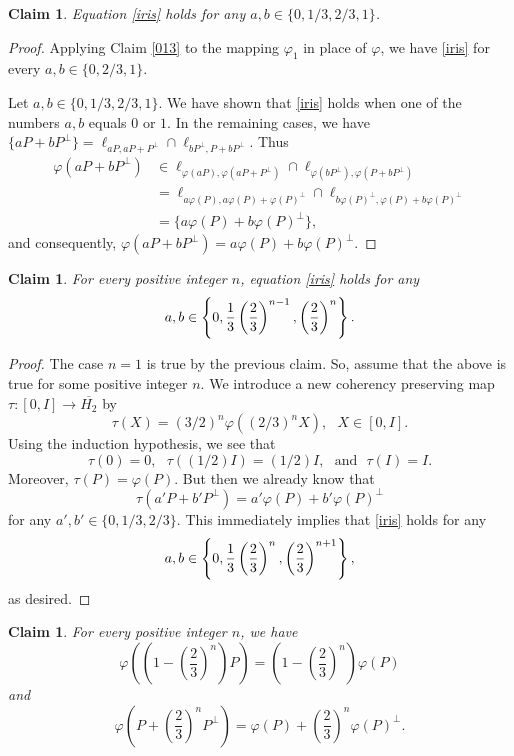 \documentclass[10pt]{amsart}
\newtheorem{claim}[theorem]{Claim}
\theoremstyle{definition}
\theoremstyle{remark}
\numberwithin{subsection}{section}
\numberwithin{equation}{section}
\newcommand\oH{{\overline{H_2}}}
\begin{document}
\begin{claim}\label{0123}
Equation \eqref{iris} holds for any $a, b\in \{0, 1/3, 2/3, 1\}$. 
\end{claim}
\begin{proof}
Applying Claim \ref{013} to the mapping $\varphi_1$ in place of $\varphi$, we have \eqref{iris} for every $a, b\in \{0, 2/3, 1\}$.

Let $a,b \in \{ 0, 1/3, 2/3, 1\}$. 
We have shown that \eqref{iris} holds when one of the numbers $a,b$ equals $0$ or $1$. 
In the remaining cases, we have $\{aP + bP^\perp\}=\ell_{aP, aP+P^\perp}\cap \ell_{bP^{\perp}, P+bP^\perp}$. Thus 
\[
\begin{split}
\varphi(aP + bP^\perp)&\in\ell_{\varphi(aP), \varphi(aP+P^\perp)}\cap \ell_{\varphi(bP^{\perp}), \varphi(P+bP^\perp)}\\
&=\ell_{a\varphi(P), a\varphi(P)+\varphi(P)^\perp}\cap \ell_{b\varphi(P)^{\perp}, \varphi(P)+b\varphi(P)^\perp}\\
&= \{a\varphi(P) + b\varphi(P)^\perp\},
\end{split}
\]
and consequently, $\varphi(aP + bP^\perp)=a\varphi(P) + b\varphi(P)^\perp$.
\end{proof}


\begin{claim}
For every positive integer $n$, equation \eqref{iris} holds for any 
\[
a,b \in \left\{ 0, {1 \over 3}  \left({2 \over 3}\right)^{n-1}, \left({2 \over 3}\right)^{n} \right\}.
\]
\end{claim}

\begin{proof}
The case $n=1$ is true by the previous claim. So, assume that the above is true for some positive integer $n$. 
We introduce a new coherency preserving map $\tau \colon [0, I ] \to \oH$ by
\[
\tau (X) = \left (3/2 \right)^n \varphi \left(\left(2/3\right)^n X \right), \ \ \ X \in [0,I].
\]
Using the induction hypothesis, we see that
\[
\tau (0) = 0, \ \ \ \tau ((1/2)I) = (1/2)I, \ \ \ \text{and} \ \ \ \tau (I) = I.
\]
Moreover, $\tau (P) = \varphi (P)$.
But then we already know that
\[
\tau (a' P + b' P^\perp ) = a' \varphi (P) + b' \varphi (P)^\perp
\]
for any $a',b' \in \{ 0, 1/3 , 2/3 \}$. This immediately implies that \eqref{iris} holds for any 
\[
a,b \in \left\{ 0, {1 \over 3}  \left({2 \over 3}\right)^{n}, \left({2 \over 3}\right)^{n+1} \right\},
\]
as desired.
\end{proof}

\begin{claim}
For every positive integer $n$, we have
\begin{equation}\label{sita}
\varphi \left( \left(1-\left(\frac{2}{3}\right)^n \right) P \right) = \left(1-\left(\frac{2}{3}\right)^n\right) \varphi ( P )
\end{equation}
and
\begin{equation}\label{ue}
\varphi \left( P +\left(\frac{2}{3}\right)^n  P^\perp \right) = \varphi (P) + \left(\frac{2}{3}\right)^n \varphi (P)^\perp.
\end{equation}
\end{claim}
\end{document}
